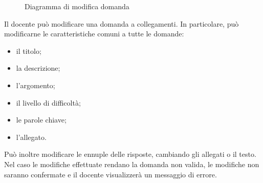 \documentclass[a4paper, titlepage]{article}
\begin{document}
\newpage
{}
\begin{figure}[H]
	\centering
	\noindent{}
	\caption{Diagramma di modifica domanda}
\end{figure}
Il docente può modificare una domanda a collegamenti. In particolare, può modificarne le caratteristiche comuni a tutte le domande:
\begin{itemize}
	\item il titolo;
	\item la descrizione;
	\item l’argomento;
	\item il livello di difficoltà;
	\item le parole chiave;
	\item l’allegato.
\end{itemize}
Può inoltre modificare le ennuple delle risposte, cambiando gli allegati o il testo. 
Nel caso le modifiche effettuate rendano la domanda non valida, le modifiche non saranno confermate e il docente visualizzerà un messaggio di errore.
\end{document}
